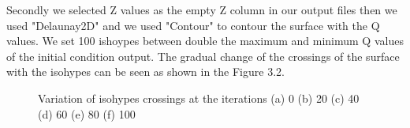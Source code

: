 \documentclass{report}
\begin{document}
\pagebreak
Secondly we selected Z values as the empty Z column in our output files then we used "Delaunay2D" and we used "Contour" to contour the surface with the Q values. We set 100 ishoypes between double the maximum and minimum Q values of the initial condition output. The gradual change of the crossings of the surface with the isohypes can be seen as shown in the Figure 3.2.
\begin{figure}
\begin{center}
\caption{Variation of isohypes crossings at the iterations (a) 0 (b) 20 (c) 40 (d) 60 (e) 80 (f) 100}
\end{center}
\end{figure}
\end{document}
